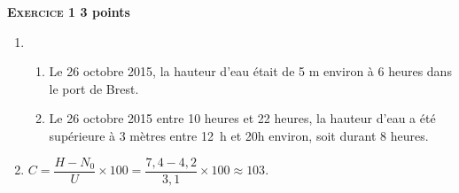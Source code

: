 \textbf{\textsc{Exercice 1} \hfill 3 points}

\medskip

\begin{enumerate}
\item 
	\begin{enumerate}
		\item Le 26 octobre 2015, la hauteur d'eau était de 5 m environ à 6 heures dans le port de Brest.
		\item Le 26 octobre 2015 entre 10 heures et 22 heures, la hauteur d'eau a été supérieure à 3 mètres entre 12~h et 20h environ, soit durant 8 heures.
	\end{enumerate}
\item $C = \dfrac{H - N_0}{U} \times 100 = \dfrac{7,4 - 4,2}{3,1} \times 100 \approx 103$.
\end{enumerate}

\vspace{0,5cm}

